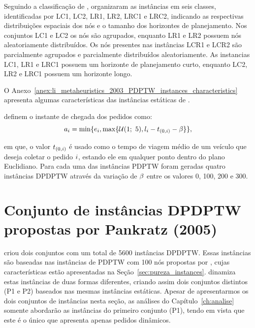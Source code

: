 Seguindo a classificação de \textcite{solomon_algorithms_1987},  
\textcite{li_metaheuristic_2003} organizaram as instâncias em seis classes, 
identificadas por LC1, LC2, LR1, LR2, LRC1 e LRC2, indicando as respectivas 
distribuições espaciais dos nós e o tamanho dos horizontes de planejamento.
Nos conjuntos LC1 e LC2 os nós são agrupados, enquanto LR1 e LR2 possuem nós 
aleatoriamente distribuídos.
Os nós presentes nas instâncias LCR1 e LCR2 são parcialmente agrupados e 
parcialmente distribuídos aleatoriamente.
As instancias LC1, LR1 e LRC1 possuem um horizonte de planejamento curto, 
enquanto LC2, LR2 e LRC1 possuem um horizonte longo.


O Anexo~\ref{anex:li_metaheuristics_2003_PDPTW_instances_characteristics}
apresenta algumas características das instâncias estáticas de
\textcite{li_metaheuristic_2003}.

\textcite{pureza_laporte_waiting_2008} definem o instante de chegada dos
pedidos como:
%
\begin{equation}
    a_{i} = \min\{e_i,
    \max\{\mathcal{U}(1;\ 5), l_i -
    t_{(0,i)} - \beta\}\},
  \label{eq:pureza_waiting_2008_requestArrivalTime}
\end{equation}


\noindent em que, o valor $t_{(0,i)}$ é usado como o tempo 
de viagem médio de um veículo que deseja coletar o pedido $i$, estando
ele em qualquer ponto dentro do plano Euclidiano.
Para cada uma das instâncias PDPTW foram geradas quatro instâncias DPDPTW 
através da variação de $\beta$ entre os valores 0, 100, 200 e 300.






\section{Conjunto de instâncias DPDPTW propostas por Pankratz (2005)}

\textcite{pankratz_dynamic_2005} criou dois conjuntos com um total de 5600 
instâncias DPDPTW.
Essas instâncias são baseadas nas instâncias de PDPTW com 100 nós propostas por
\textcite{li_metaheuristic_2003}, cujas características estão apresentadas 
na Seção~\ref{sec:pureza_instances}.
\textcite{pankratz_dynamic_2005} dinamiza estas instâncias de duas formas 
diferentes, criando assim dois conjuntos distintos (P1 e P2) baseados 
nas mesmas instâncias estáticas.
Apesar de apresentarmos os dois conjuntos de instâncias nesta seção, as 
análises do Capítulo~\ref{ch:analise} somente abordarão as instâncias do 
primeiro conjunto (P1), tendo em vista que este é o único que apresenta apenas
pedidos dinâmicos.


